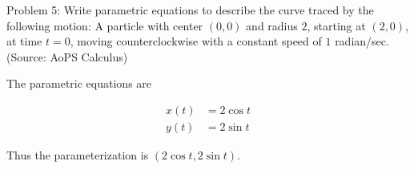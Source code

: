 Problem 5: Write parametric equations to describe the curve traced by the following motion: A particle with center $(0, 0)$ and radius $2$, starting at $(2, 0)$, at time $t = 0$, moving counterclockwise with a constant speed of $1$ radian/sec. (Source: AoPS Calculus)

The parametric equations are

\begin{align*}
x(t) &= 2 \cos t \\
y(t) &= 2 \sin t
\end{align*}

Thus the parameterization is $\boxed{(2 \cos t, 2 \sin t)}$.
